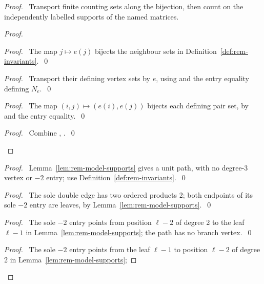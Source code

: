 \begin{proof}
\pfsketch\ Transport finite counting sets along the bijection, then
count on the independently labelled supports of the named matrices.
\begin{proof}
\begin{proof}\pf\ The map $j\mapsto e(j)$ bijects the neighbour sets
in Definition~\ref{def:rem-invariants}.~\qed\end{proof}
\begin{proof}\pf\ Transport their defining vertex sets by $e$,
using  and the entry equality defining $N_e$.~\qed\end{proof}
\begin{proof}\pf\ The map $(i,j)\mapsto(e(i),e(j))$ bijects each
defining pair set, by  and the entry equality.~\qed\end{proof}
\qedstep
\begin{proof}\pf\ Combine , .~\qed\end{proof}
\end{proof}
\begin{proof}\pf\ Lemma~\ref{lem:rem-model-supports} gives a unit
path, with no degree-3 vertex or $-2$ entry; use
Definition~\ref{def:rem-invariants}.~\qed\end{proof}
\begin{proof}\pf\ The sole double edge has two ordered products 2;
both endpoints of its sole $-2$ entry are leaves, by
Lemma~\ref{lem:rem-model-supports}.~\qed\end{proof}
\begin{proof}\pf\ The sole $-2$ entry points from position $\ell-2$
of degree 2 to the leaf $\ell-1$ in Lemma~\ref{lem:rem-model-supports};
the path has no branch vertex.~\qed\end{proof}
\begin{proof}\pf\ The sole $-2$ entry points from the leaf $\ell-1$
to position $\ell-2$ of degree 2 in Lemma~\ref{lem:rem-model-supports};

\end{proof}
\end{proof}
